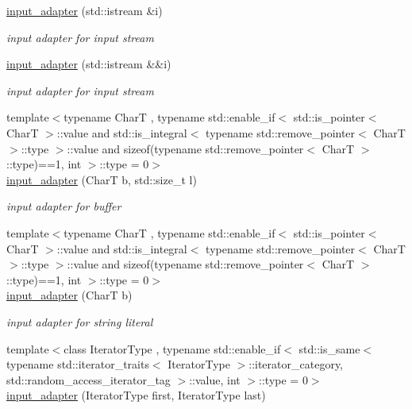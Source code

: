 \begin{DoxyCompactItemize}
\item 
\hyperlink{classnlohmann_1_1detail_1_1input__adapter_ae89f11268d4724b3080473f7218abe86}{input\+\_\+adapter} (std\+::istream \&i)
\begin{DoxyCompactList}\small\item\em input adapter for input stream \end{DoxyCompactList}\item 
\hyperlink{classnlohmann_1_1detail_1_1input__adapter_af002dd2e53ac0855a03cb68d0ce626b2}{input\+\_\+adapter} (std\+::istream \&\&i)
\begin{DoxyCompactList}\small\item\em input adapter for input stream \end{DoxyCompactList}\item 
{\footnotesize template$<$typename CharT , typename std\+::enable\+\_\+if$<$ std\+::is\+\_\+pointer$<$ Char\+T $>$\+::value and std\+::is\+\_\+integral$<$ typename std\+::remove\+\_\+pointer$<$ Char\+T $>$\+::type $>$\+::value and sizeof(typename std\+::remove\+\_\+pointer$<$ Char\+T $>$\+::type)==1, int $>$\+::type  = 0$>$ }\\\hyperlink{classnlohmann_1_1detail_1_1input__adapter_a37816622d79ab4a1a76f4d7e872b65e1}{input\+\_\+adapter} (CharT b, std\+::size\+\_\+t l)
\begin{DoxyCompactList}\small\item\em input adapter for buffer \end{DoxyCompactList}\item 
{\footnotesize template$<$typename CharT , typename std\+::enable\+\_\+if$<$ std\+::is\+\_\+pointer$<$ Char\+T $>$\+::value and std\+::is\+\_\+integral$<$ typename std\+::remove\+\_\+pointer$<$ Char\+T $>$\+::type $>$\+::value and sizeof(typename std\+::remove\+\_\+pointer$<$ Char\+T $>$\+::type)==1, int $>$\+::type  = 0$>$ }\\\hyperlink{classnlohmann_1_1detail_1_1input__adapter_a86f035d9c4319360014b922b5e433ced}{input\+\_\+adapter} (CharT b)
\begin{DoxyCompactList}\small\item\em input adapter for string literal \end{DoxyCompactList}\item 
{\footnotesize template$<$class Iterator\+Type , typename std\+::enable\+\_\+if$<$ std\+::is\+\_\+same$<$ typename std\+::iterator\+\_\+traits$<$ Iterator\+Type $>$\+::iterator\+\_\+category, std\+::random\+\_\+access\+\_\+iterator\+\_\+tag $>$\+::value, int $>$\+::type  = 0$>$ }\\\hyperlink{classnlohmann_1_1detail_1_1input__adapter_ad6824b0f792691f75186c527fa31a6b4}{input\+\_\+adapter} (Iterator\+Type first, Iterator\+Type last)

\end{DoxyCompactItemize}
